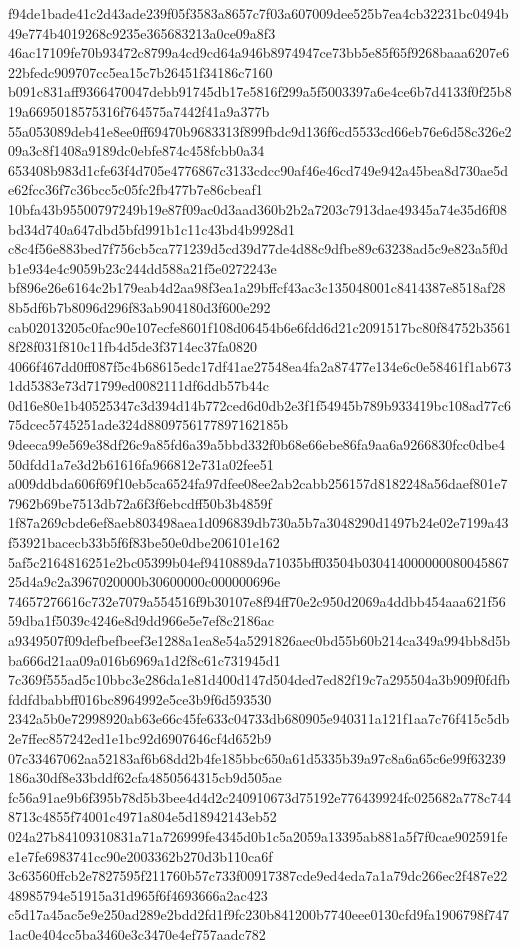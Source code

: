\documentclass[11pt,a4paper]{article}
\begin{document}
{f94de1bade41c2d43ade239f05f3583a8657c7f03a607009dee525b7ea4cb32231bc0494b49e774b4019268c9235e365683213a0ce09a8f3
46ac17109fe70b93472c8799a4cd9cd64a946b8974947ce73bb5e85f65f9268baaa6207e622bfedc909707cc5ea15c7b26451f34186c7160
b091c831aff9366470047debb91745db17e5816f299a5f5003397a6e4ce6b7d4133f0f25b819a6695018575316f764575a7442f41a9a377b
55a053089deb41e8ee0ff69470b9683313f899fbdc9d136f6cd5533cd66eb76e6d58c326e209a3c8f1408a9189dc0ebfe874c458fcbb0a34
653408b983d1cfe63f4d705e4776867c3133cdcc90af46e46cd749e942a45bea8d730ae5de62fcc36f7c36bcc5c05fc2fb477b7e86cbeaf1
10bfa43b95500797249b19e87f09ac0d3aad360b2b2a7203c7913dae49345a74e35d6f08bd34d740a647dbd5bfd991b1c11c43bd4b9928d1
c8c4f56e883bed7f756cb5ca771239d5cd39d77de4d88c9dfbe89c63238ad5c9e823a5f0db1e934e4c9059b23c244dd588a21f5e0272243e
bf896e26e6164c2b179eab4d2aa98f3ea1a29bffcf43ac3c135048001c8414387e8518af288b5df6b7b8096d296f83ab904180d3f600e292
cab02013205c0fac90e107ecfe8601f108d06454b6e6fdd6d21c2091517bc80f84752b35618f28f031f810c11fb4d5de3f3714ec37fa0820
4066f467dd0ff087f5c4b68615edc17df41ae27548ea4fa2a87477e134e6c0e58461f1ab6731dd5383e73d71799ed0082111df6ddb57b44c
0d16e80e1b40525347c3d394d14b772ced6d0db2e3f1f54945b789b933419bc108ad77c675dcec5745251ade324d8809756177897162185b
9deeca99e569e38df26c9a85fd6a39a5bbd332f0b68e66ebe86fa9aa6a9266830fcc0dbe450dfdd1a7e3d2b61616fa966812e731a02fee51
a009ddbda606f69f10eb5ca6524fa97dfee08ee2ab2cabb256157d8182248a56daef801e77962b69be7513db72a6f3f6ebcdff50b3b4859f
1f87a269cbde6ef8aeb803498aea1d096839db730a5b7a3048290d1497b24e02e7199a43f53921bacecb33b5f6f83be50e0dbe206101e162
5af5c2164816251e2bc05399b04ef9410889da71035bff03504b03041400000008004586725d4a9c2a3967020000b30600000c000000696e
74657276616c732e7079a554516f9b30107e8f94ff70e2c950d2069a4ddbb454aaa621f5659dba1f5039c4246e8d9dd966e5e7ef8c2186ac
a9349507f09defbefbeef3e1288a1ea8e54a5291826aec0bd55b60b214ca349a994bb8d5bba666d21aa09a016b6969a1d2f8c61c731945d1
7c369f555ad5c10bbc3e286da1e81d400d147d504ded7ed82f19c7a295504a3b909f0fdfbfddfdbabbff016bc8964992e5ce3b9f6d593530
2342a5b0e72998920ab63e66c45fe633c04733db680905e940311a121f1aa7c76f415c5db2e7ffec857242ed1e1bc92d6907646cf4d652b9
07c33467062aa52183af6b68dd2b4fe185bbc650a61d5335b39a97c8a6a65c6e99f63239186a30df8e33bddf62cfa4850564315cb9d505ae
fc56a91ae9b6f395b78d5b3bee4d4d2c240910673d75192e776439924fc025682a778c7448713c4855f74001c4971a804e5d18942143eb52
024a27b84109310831a71a726999fe4345d0b1c5a2059a13395ab881a5f7f0cae902591fee1e7fe6983741cc90e2003362b270d3b110ca6f
3c63560ffcb2e7827595f211760b57c733f00917387cde9ed4eda7a1a79dc266ec2f487e2248985794e51915a31d965f6f4693666a2ac423
c5d17a45ac5e9e250ad289e2bdd2fd1f9fc230b841200b7740eee0130cfd9fa1906798f7471ac0e404cc5ba3460e3c3470e4ef757aadc782
}
\end{document}
